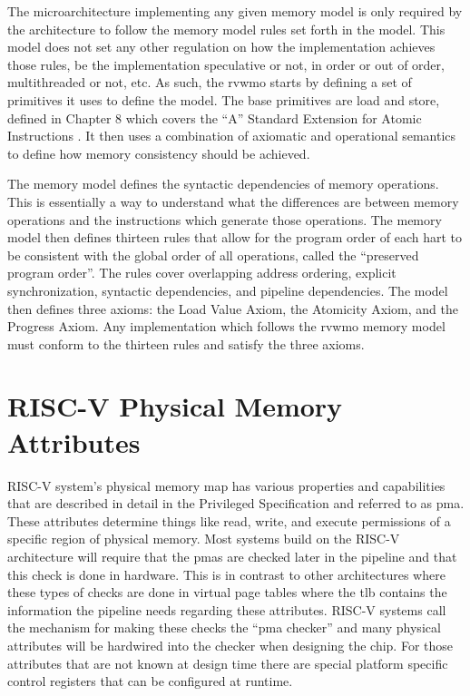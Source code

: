 The microarchitecture implementing any given memory model is only required by the architecture to follow the memory model rules set forth in the model. This model does not set any other regulation on how the implementation achieves those rules, be the implementation speculative or not, in order or out of order, multithreaded or not, etc. As such, the \gls{rvwmo} starts by defining a set of primitives it uses to define the model. The base primitives are load and store, defined in Chapter 8 which covers the ``A'' Standard Extension for Atomic Instructions \cite{UnprivIsa2019}. It then uses a combination of \gls{axiomatic} and \gls{operational} semantics to define how memory consistency should be achieved.

The memory model defines the syntactic dependencies of memory operations. This is essentially a way to understand what the differences are between memory operations and the instructions which generate those operations. The memory model then defines thirteen rules that allow for the program order of each \gls{hart} to be consistent with the global order of all operations, called the ``preserved program order''. The rules cover overlapping address ordering, explicit synchronization, syntactic dependencies, and pipeline dependencies. The model then defines three axioms: the Load Value Axiom, the Atomicity Axiom, and the Progress Axiom. Any implementation which follows the \gls{rvwmo} memory model must conform to the thirteen rules and satisfy the three axioms.

\section{RISC-V Physical Memory Attributes}
RISC-V system's physical memory map has various properties and capabilities that are described in detail in the Privileged Specification \cite{PrivIsa2019} and referred to as \gls{pma}. These attributes determine things like read, write, and execute permissions of a specific region of physical memory. Most systems build on the RISC-V architecture will require that the \glspl{pma} are checked later in the pipeline and that this check is done in hardware. This is in contrast to other architectures where these types of checks are done in virtual page tables where the \gls{tlb} contains the information the pipeline needs regarding these attributes. RISC-V systems call the mechanism for making these checks the ``\gls{pma} checker'' and many physical attributes will be hardwired into the checker when designing the chip. For those attributes that are not known at design time there are special platform specific control registers that can be configured at runtime.

